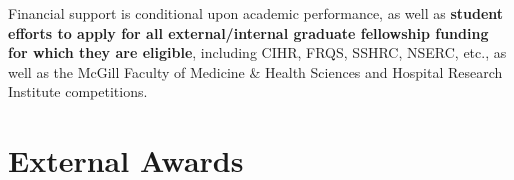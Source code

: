 \documentclass[
]{book}
\begin{document}
Financial support is conditional upon academic performance, as well as \textbf{student efforts to apply for all external/internal graduate fellowship funding for which they are eligible}, including CIHR, FRQS, SSHRC, NSERC, etc., as well as the McGill Faculty of Medicine \& Health Sciences and Hospital Research Institute competitions.

\hypertarget{external-awards}{%
\section{External Awards}\label{external-awards}}

  
\end{document}
